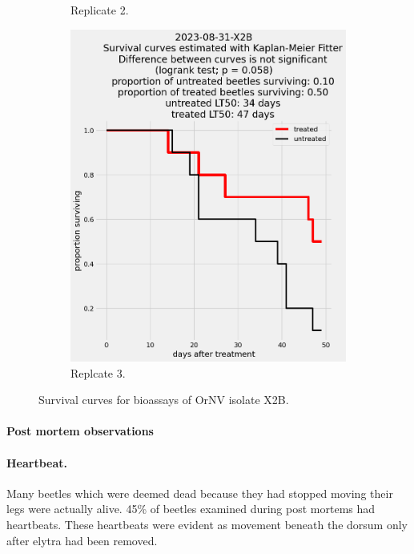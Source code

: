 \documentclass[12pt,letterpaper,english,bibliography=totocnumbered, abstract=on]{scrartcl}
\begin{document}
\begin{figure}[h]
\begin{subfigure}{.3\textwidth}
		\caption{Replicate 2.}
	\end{subfigure}
	\begin{subfigure}{.3\textwidth}
		\includegraphics[width=\textwidth]{images/survival_curves/2023-08-31-X2B}
		\caption{Replcate 3.}
	\end{subfigure}
	\caption{Survival curves for bioassays of OrNV isolate X2B.}
	\label{fig:X2B survival curves}
\end{figure}

\clearpage
\paragraph{Post mortem observations}

\paragraph{Heartbeat.} Many beetles which were deemed dead because they had stopped moving their legs were actually alive. 45\% of beetles examined during post mortems had heartbeats. These heartbeats were evident as movement beneath the dorsum only after elytra had been removed.  
\end{document}
